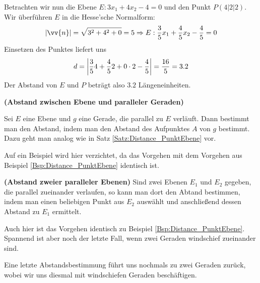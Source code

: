 \documentclass[ngerman, 12pt]{nssheetxea}
\begin{document}
\begin{example}
Betrachten wir nun die Ebene $E:3x_1+4x_2-4=0$ und den Punkt $P(4|2|2)$. Wir überführen $E$ in die Hesse'sche Normalform:
\[ |\vv{n}| = \sqrt{3^2+4^2+0} = 5 \Rightarrow E: \frac{3}{5}x_1+\frac{4}{5}x_2 - \frac{4}{5} = 0\]
Einsetzen des Punktes liefert uns
\[ d= \mleft| \frac{3}{5} 4 + \frac{4}{5} 2 + 0 \cdot 2 - \frac{4}{5}\mright| = \frac{16}{5} = \num{3,2}\]
Der Abstand von $E$ und $P$ beträgt also $\num{3,2}$ Längeneinheiten.
\label{Bsp:Distance_PunktEbene}
\end{example}

\begin{theorem} \textbf{(Abstand zwischen Ebene und paralleler Geraden)} \par
Sei $E$ eine Ebene und $g$ eine Gerade, die parallel zu $E$ verläuft. Dann bestimmt man den Abstand, indem man den Abstand des Aufpunktes $A$ von $g$ bestimmt. Dazu geht man analog wie in Satz \ref{Satz:Distance_PunktEbene} vor.
\label{Satz:Abstand_Ebene_Gerade_parallel}
\end{theorem}

Auf ein Beispiel wird hier verzichtet, da das Vorgehen mit dem Vorgehen aus Beispiel \ref{Bsp:Distance_PunktEbene} identisch ist.

\begin{theorem} \textbf{(Abstand zweier paralleler Ebenen)}
Sind zwei Ebenen $E_1$ und $E_2$ gegeben, die parallel zueinander verlaufen, so kann man dort den Abtand bestimmen, indem man einen beliebigen Punkt aus $E_2$ auswählt und anschließend dessen Abstand zu $E_1$ ermittelt.
\end{theorem}

Auch hier ist das Vorgehen identisch zu Beispiel \ref{Bsp:Distance_PunktEbene}. Spannend ist aber noch der letzte Fall, wenn zwei Geraden windschief zueinander sind. \par
Eine letzte Abstandsbestimmung führt uns nochmals zu zwei Geraden zurück, wobei wir uns diesmal mit windschiefen Geraden beschäftigen. 
\end{document}
